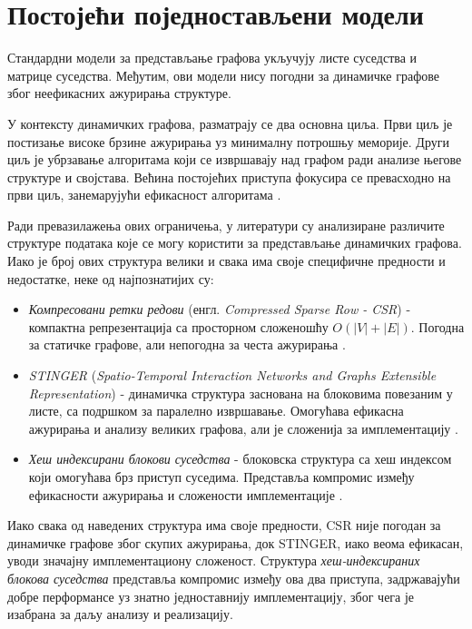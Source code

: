 \section{Постојећи поједностављени модели}


Стандардни модели за представљање графова укључују листе суседства и матрице суседства. Међутим, ови модели нису погодни за динамичке графове због неефикасних ажурирања структуре.

У контексту динамичких графова, разматрају се два основна циља. Први циљ је постизање високе брзине ажурирања уз минималну потрошњу меморије. Други циљ је убрзавање алгоритама који се извршавају над графом ради анализе његове структуре и својстава. Већина постојећих приступа фокусира се превасходно на први циљ, занемарујући ефикасност алгоритама \cite{vandergrinten_et_al:LIPIcs.SEA.2022.11}.

Ради превазилажења ових ограничења, у литератури су анализиране различите структуре података које се могу користити за представљање динамичких графова. Иако је број ових структура велики и свака има своје специфичне предности и недостатке, неке од најпознатијих су:

\begin{itemize}
    \item \textit{Компресовани ретки редови} (енгл. \textit{Compressed Sparse Row - CSR}) - компактна репрезентација са просторном сложеношћу $O(|V| + |E|)$. Погодна за статичке графове, али непогодна за честа ажурирања \cite{wheatman2018packed,islam2024dgapefficientdynamicgraph}.
    \item \textit{STINGER} (\textit{Spatio-Temporal Interaction Networks and Graphs Extensible\\ Representation}) - динамичка структура заснована на блоковима повезаним у листе, са подршком за паралелно извршавање. Омогућава ефикасна ажурирања и анализу великих графова, али је сложенија за имплементацију \cite{ediger2012stinger}.
    \item \textit{Хеш индексирани блокови суседства} - блоковска структура са хеш индексом који омогућава брз приступ суседима. Представља компромис између ефикасности ажурирања и сложености имплементације \cite{vandergrinten_et_al:LIPIcs.SEA.2022.11}.
\end{itemize}

Иако свака од наведених структура има своје предности, CSR није погодан за динамичке графове због скупих ажурирања, док STINGER, иако веома ефикасан, уводи значајну имплементациону сложеност. Структура \emph{хеш-индексираних блокова суседства} представља компромис између ова два приступа, задржавајући добре перформансе уз знатно једноставнију имплементацију, због чега је изабрана за даљу анализу и реализацију.

